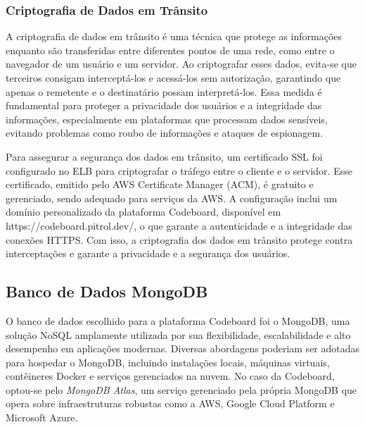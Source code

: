\subsubsection{Criptografia de Dados em Trânsito}

A criptografia de dados em trânsito é uma técnica que protege as informações enquanto são transferidas entre diferentes pontos de uma rede, como entre o navegador de um usuário e um servidor. Ao criptografar esses dados, evita-se que terceiros consigam interceptá-los e acessá-los sem autorização, garantindo que apenas o remetente e o destinatário possam interpretá-los. Essa medida é fundamental para proteger a privacidade dos usuários e a integridade das informações, especialmente em plataformas que processam dados sensíveis, evitando problemas como roubo de informações e ataques de espionagem.

Para assegurar a segurança dos dados em trânsito, um certificado SSL foi configurado no ELB para criptografar o tráfego entre o cliente e o servidor. Esse certificado, emitido pelo AWS Certificate Manager (ACM), é gratuito e gerenciado, sendo adequado para serviços da AWS. A configuração inclui um domínio personalizado da plataforma Codeboard, disponível em https://codeboard.pitrol.dev/, o que garante a autenticidade e a integridade das conexões HTTPS. Com isso, a criptografia dos dados em trânsito protege contra interceptações e garante a privacidade e a segurança dos usuários.


\subsection{Banco de Dados MongoDB}

O banco de dados escolhido para a plataforma Codeboard foi o MongoDB, uma solução NoSQL amplamente utilizada por sua flexibilidade, escalabilidade e alto desempenho em aplicações modernas. Diversas abordagens poderiam ser adotadas para hospedar o MongoDB, incluindo instalações locais, máquinas virtuais, contêineres Docker e serviços gerenciados na nuvem. No caso da Codeboard, optou-se pelo \emph{MongoDB Atlas}, um serviço gerenciado pela própria MongoDB que opera sobre infraestruturas robustas como a AWS, Google Cloud Platform e Microsoft Azure.

